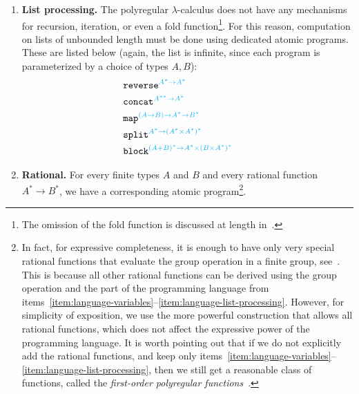 \begin{enumerate}
    We also have  atomic programs for deconstructing data:
        \begin{align*}
& \church     \fstterm {A \times B \to A} \\
& \church     \sndterm {A \times B \to B} \\
& \church     {\mathtt{uncons}} {A^* \to 1 + A \times A^*} \\
& \church     \casesterm {(A \to C) \to (B \to C) \to (A + B) \to C}    \end{align*}
        The above list is not finite, since each program represents a family of programs, which is parameterized by the choice of types $A,B,C$.
    \item \textbf{List processing.}  \label{item:language-list-processing} The polyregular $\lambda$-calculus does not have any mechanisms for recursion, iteration, or even a fold function\footnote{The omission of the fold function is discussed at length in~\cite{polyregular-fold}.}. For this reason, computation on lists of unbounded length  must be done using dedicated atomic programs. These are listed below (again, the list is infinite, since each program is parameterized by a choice of types $A,B$):
    \begin{align*}
       & \mathtt{reverse}^{{\color{cyan}A^* \to A^*}} \\
        & \mathtt{concat}^{{\color{cyan}A^{**} \to A^*}} \\
       & \mathtt{map}^{{\color{cyan}(A \to B) \to A^* \to B^*}} \\
       & \mathtt{split}^{{\color{cyan}A^* \to (A^* \times A^*)^*}} \\
        &        \mathtt{block}^{{\color{cyan}(A+B)^* \to A^* \times (B \times A^*)^*}} \qquad 
    \end{align*}
   
    \item \textbf{Rational.} For every finite types $A$ and $B$ and every rational function $A^* \to B^*$, we have a corresponding atomic program\footnote{In fact, for expressive completeness, it is enough to have only very special rational functions that evaluate the group operation in a finite group, see~\cite[Figure 1]{polyregular-survey}. This is because all other rational functions can be derived using the group operation and the part of the programming language from items~\ref{item:language-variables}--\ref{item:language-list-processing}. However, for simplicity of exposition, we use the more powerful construction that allows all rational functions, which does not affect the expressive power of the programming language. It is worth pointing out that if we do not explicitly add the rational functions, and keep only items~\ref{item:language-variables}--\ref{item:language-list-processing}, then we still get a reasonable class of functions, called the \emph{first-order polyregular functions}~\cite[Theorem 4.4]{bojanczykPolyregularFunctions2018}.}.
\end{enumerate}

